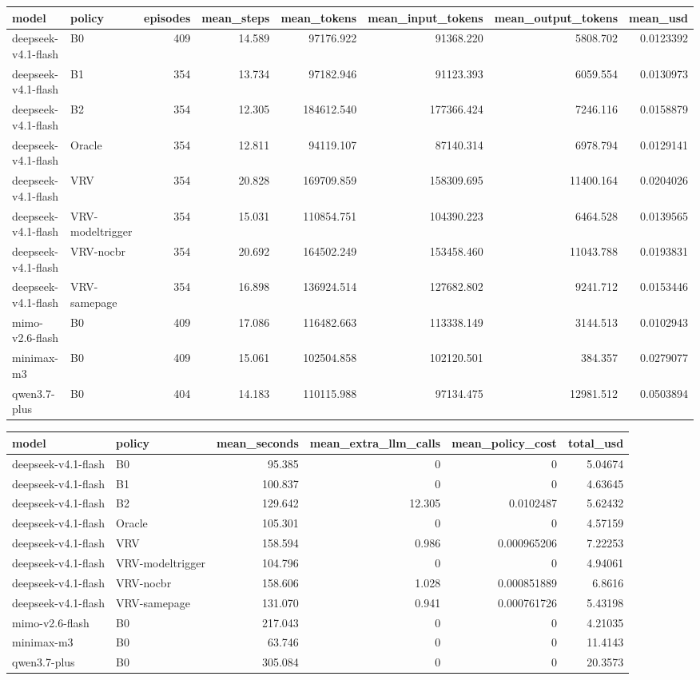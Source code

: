 \begin{tabular}{llrrrrrr}
\toprule
model & policy & episodes & mean\_steps & mean\_tokens & mean\_input\_tokens & mean\_output\_tokens & mean\_usd \\
\midrule
deepseek-v4.1-flash & B0 & 409 & 14.589 & 97176.922 & 91368.220 & 5808.702 & 0.0123392 \\
deepseek-v4.1-flash & B1 & 354 & 13.734 & 97182.946 & 91123.393 & 6059.554 & 0.0130973 \\
deepseek-v4.1-flash & B2 & 354 & 12.305 & 184612.540 & 177366.424 & 7246.116 & 0.0158879 \\
deepseek-v4.1-flash & Oracle & 354 & 12.811 & 94119.107 & 87140.314 & 6978.794 & 0.0129141 \\
deepseek-v4.1-flash & VRV & 354 & 20.828 & 169709.859 & 158309.695 & 11400.164 & 0.0204026 \\
deepseek-v4.1-flash & VRV-modeltrigger & 354 & 15.031 & 110854.751 & 104390.223 & 6464.528 & 0.0139565 \\
deepseek-v4.1-flash & VRV-nocbr & 354 & 20.692 & 164502.249 & 153458.460 & 11043.788 & 0.0193831 \\
deepseek-v4.1-flash & VRV-samepage & 354 & 16.898 & 136924.514 & 127682.802 & 9241.712 & 0.0153446 \\
mimo-v2.6-flash & B0 & 409 & 17.086 & 116482.663 & 113338.149 & 3144.513 & 0.0102943 \\
minimax-m3 & B0 & 409 & 15.061 & 102504.858 & 102120.501 & 384.357 & 0.0279077 \\
qwen3.7-plus & B0 & 404 & 14.183 & 110115.988 & 97134.475 & 12981.512 & 0.0503894 \\
\bottomrule
\end{tabular}

\begin{tabular}{llrrrr}
\toprule
model & policy & mean\_seconds & mean\_extra\_llm\_calls & mean\_policy\_cost & total\_usd \\
\midrule
deepseek-v4.1-flash & B0 & 95.385 & 0 & 0 & 5.04674 \\
deepseek-v4.1-flash & B1 & 100.837 & 0 & 0 & 4.63645 \\
deepseek-v4.1-flash & B2 & 129.642 & 12.305 & 0.0102487 & 5.62432 \\
deepseek-v4.1-flash & Oracle & 105.301 & 0 & 0 & 4.57159 \\
deepseek-v4.1-flash & VRV & 158.594 & 0.986 & 0.000965206 & 7.22253 \\
deepseek-v4.1-flash & VRV-modeltrigger & 104.796 & 0 & 0 & 4.94061 \\
deepseek-v4.1-flash & VRV-nocbr & 158.606 & 1.028 & 0.000851889 & 6.8616 \\
deepseek-v4.1-flash & VRV-samepage & 131.070 & 0.941 & 0.000761726 & 5.43198 \\
mimo-v2.6-flash & B0 & 217.043 & 0 & 0 & 4.21035 \\
minimax-m3 & B0 & 63.746 & 0 & 0 & 11.4143 \\
qwen3.7-plus & B0 & 305.084 & 0 & 0 & 20.3573 \\
\bottomrule
\end{tabular}
